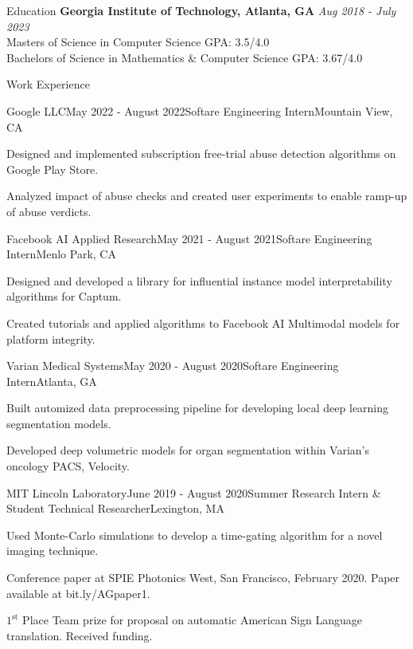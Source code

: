 \documentclass{template} %
\begin{document}

\begin{rSection}{Education}
{\bf Georgia Institute of Technology, Atlanta, GA} \hfill {\em Aug 2018 - July 2023}
\\ Masters of Science in Computer Science \hfill  GPA: 3.5/4.0
\\ Bachelors of Science in Mathematics \& Computer Science \hfill  GPA: 3.67/4.0
\end{rSection}


\begin{rSection}{Work Experience}

\begin{rSubsection}{Google LLC}{May 2022 - August 2022}{Softare Engineering Intern}{Mountain View, CA}
\item Designed and implemented subscription free-trial abuse detection algorithms on Google Play Store.
\item Analyzed impact of abuse checks and created user experiments to enable ramp-up of abuse verdicts.
\end{rSubsection}

\begin{rSubsection}{Facebook AI Applied Research}{May 2021 - August 2021}{Softare Engineering Intern}{Menlo Park, CA}
\item Designed and developed a library for influential instance model interpretability algorithms for Captum.
\item Created tutorials and applied algorithms to Facebook AI Multimodal models for platform integrity. 
\end{rSubsection}

\begin{rSubsection}{Varian Medical Systems}{May 2020 - August 2020}{Softare Engineering Intern}{Atlanta, GA}
\item Built automized data preprocessing pipeline for developing local deep learning segmentation models.
\item Developed deep volumetric models for organ segmentation within Varian's oncology PACS, Velocity.
\end{rSubsection}

\begin{rSubsection}{MIT Lincoln Laboratory}{June 2019 - August 2020}{Summer Research Intern \& Student Technical Researcher}{Lexington, MA}
\item Used Monte-Carlo simulations to develop a time-gating algorithm for a novel imaging technique.
\item Conference paper at SPIE Photonics West, San Francisco, February 2020. Paper available at bit.ly/AGpaper1.
\item$1^{\text{st}}$ Place Team prize for proposal on automatic American Sign Language translation. Received funding.
\end{rSubsection}

\end{rSection}
\vspace{-2mm}
\end{document}
